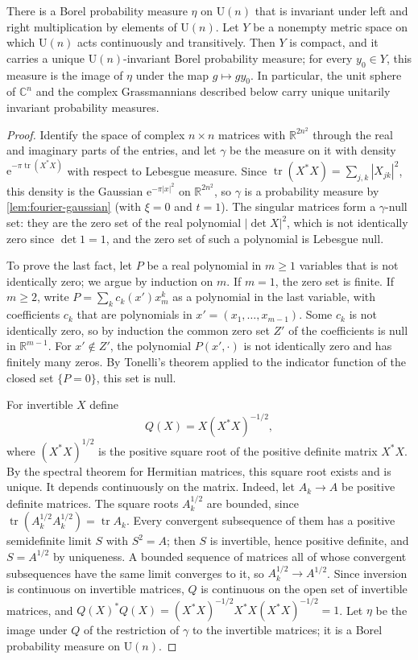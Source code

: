 \begin{proposition}\label{prop:unitary-invariant-probability}
There is a Borel probability measure $\eta$ on $\mathrm U(n)$ that is invariant under left and right multiplication by elements of $\mathrm U(n)$. Let $Y$ be a nonempty metric space on which $\mathrm U(n)$ acts continuously and transitively. Then $Y$ is compact, and it carries a unique $\mathrm U(n)$-invariant Borel probability measure; for every $y_0\in Y$, this measure is the image of $\eta$ under the map $g\mapsto gy_0$. In particular, the unit sphere of $\mathbb C^n$ and the complex Grassmannians described below carry unique unitarily invariant probability measures.
\end{proposition}
\begin{proof}
Identify the space of complex $n\times n$ matrices with $\mathbb R^{2n^2}$ through the real and imaginary parts of the entries, and let $\gamma$ be the measure on it with density $\mathrm e^{-\pi\operatorname{tr}(X^*X)}$ with respect to Lebesgue measure. Since $\operatorname{tr}(X^*X)=\sum_{j,k}|X_{jk}|^2$, this density is the Gaussian $\mathrm e^{-\pi|x|^2}$ on $\mathbb R^{2n^2}$, so $\gamma$ is a probability measure by \cref{lem:fourier-gaussian} (with $\xi=0$ and $t=1$). The singular matrices form a $\gamma$-null set: they are the zero set of the real polynomial $|\det X|^2$, which is not identically zero since $\det1=1$, and the zero set of such a polynomial is Lebesgue null.

To prove the last fact, let $P$ be a real polynomial in $m\geq1$ variables that is not identically zero; we argue by induction on $m$. If $m=1$, the zero set is finite. If $m\geq2$, write $P=\sum_kc_k(x')x_m^k$ as a polynomial in the last variable, with coefficients $c_k$ that are polynomials in $x'=(x_1,\ldots,x_{m-1})$. Some $c_k$ is not identically zero, so by induction the common zero set $Z'$ of the coefficients is null in $\mathbb R^{m-1}$. For $x'\notin Z'$, the polynomial $P(x',\cdot)$ is not identically zero and has finitely many zeros. By Tonelli's theorem applied to the indicator function of the closed set $\{P=0\}$, this set is null.

For invertible $X$ define
\[
 Q(X)=X(X^*X)^{-1/2},
\]
where $(X^*X)^{1/2}$ is the positive square root of the positive definite matrix $X^*X$. By the spectral theorem for Hermitian matrices, this square root exists and is unique. It depends continuously on the matrix. Indeed, let $A_k\to A$ be positive definite matrices. The square roots $A_k^{1/2}$ are bounded, since $\operatorname{tr}(A_k^{1/2}A_k^{1/2})=\operatorname{tr}A_k$. Every convergent subsequence of them has a positive semidefinite limit $S$ with $S^2=A$; then $S$ is invertible, hence positive definite, and $S=A^{1/2}$ by uniqueness. A bounded sequence of matrices all of whose convergent subsequences have the same limit converges to it, so $A_k^{1/2}\to A^{1/2}$. Since inversion is continuous on invertible matrices, $Q$ is continuous on the open set of invertible matrices, and $Q(X)^*Q(X)=(X^*X)^{-1/2}X^*X(X^*X)^{-1/2}=1$. Let $\eta$ be the image under $Q$ of the restriction of $\gamma$ to the invertible matrices; it is a Borel probability measure on $\mathrm U(n)$.


\end{proof}
